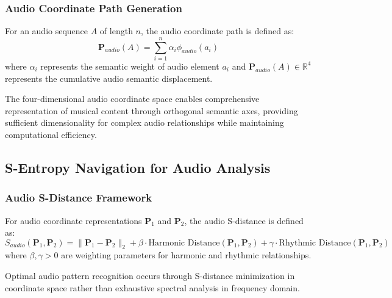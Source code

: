 \subsubsection{Audio Coordinate Path Generation}

\begin{definition}
For an audio sequence $A$ of length $n$, the audio coordinate path is defined as:
\begin{equation}
\mathbf{P}_{audio}(A) = \sum_{i=1}^n \alpha_i \phi_{audio}(a_i)
\end{equation}
where $\alpha_i$ represents the semantic weight of audio element $a_i$ and $\mathbf{P}_{audio}(A) \in \mathbb{R}^4$ represents the cumulative audio semantic displacement.
\end{definition}

The four-dimensional audio coordinate space enables comprehensive representation of musical content through orthogonal semantic axes, providing sufficient dimensionality for complex audio relationships while maintaining computational efficiency.

\subsection{S-Entropy Navigation for Audio Analysis}

\subsubsection{Audio S-Distance Framework}

\begin{definition}
For audio coordinate representations $\mathbf{P}_1$ and $\mathbf{P}_2$, the audio S-distance is defined as:
\begin{equation}
S_{audio}(\mathbf{P}_1, \mathbf{P}_2) = \|\mathbf{P}_1 - \mathbf{P}_2\|_2 + \beta \cdot \text{Harmonic Distance}(\mathbf{P}_1, \mathbf{P}_2) + \gamma \cdot \text{Rhythmic Distance}(\mathbf{P}_1, \mathbf{P}_2)
\end{equation}
where $\beta, \gamma > 0$ are weighting parameters for harmonic and rhythmic relationships.
\end{definition}

\begin{theorem}
Optimal audio pattern recognition occurs through S-distance minimization in coordinate space rather than exhaustive spectral analysis in frequency domain.
\end{theorem}


